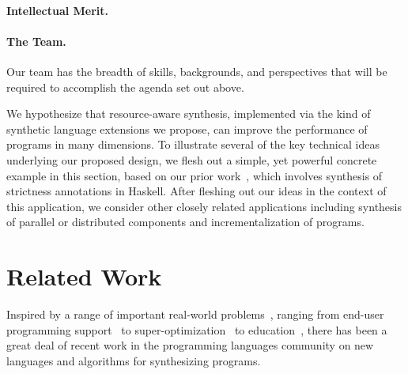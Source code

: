 \paragraph*{Intellectual Merit.}


\paragraph{The Team.}  Our team has the breadth of skills, backgrounds, and perspectives that will be required to accomplish the agenda set out above.


We hypothesize that resource-aware synthesis, implemented via the kind
of synthetic language extensions we propose, can improve the
performance of programs in many dimensions.  To illustrate several of
the key technical ideas underlying our proposed design, we flesh out a
simple, yet powerful concrete example in this section, based on our
prior work~\cite{autobahn}, which involves synthesis of strictness
annotations in Haskell.  After fleshing out our ideas in the context
of this application, we consider other closely related applications
including synthesis of parallel or distributed components and
incrementalization of programs.

\section{Related Work}

Inspired by a range of important real-world
problems~\cite{inductive-programming-meets-real-world}, ranging from
end-user programming
support~\cite{Barowy:flashrelate,Harris:spread-sheets} to
super-optimization~\cite{stochastic-superopt} to
education~\cite{Gulwani:cacm-education,Singh:education}, there has
been a great deal of recent work in the programming languages
community on new languages and algorithms for synthesizing programs.

